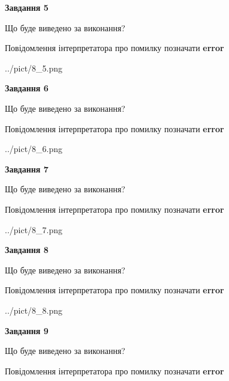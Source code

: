 \documentclass[11pt, ukrainian]{article}
\begin{document}
{\begin {large}
{\begin {center}\textbf{Завдання 5}\end {center}}\par
Що буде виведено за виконання? \par
Повідомлення інтерпретатора про помилку позначати \textbf{error}

\begin{center}
	{../pict/8_5.png}
\end{center}
\newpage

{\begin {center}\textbf{Завдання 6}\end {center}}\par
Що буде виведено за виконання? \par
Повідомлення інтерпретатора про помилку позначати \textbf{error}

\begin{center}
	{../pict/8_6.png}
\end{center}
\newpage

{\begin {center}\textbf{Завдання 7}\end {center}}\par
Що буде виведено за виконання? \par
Повідомлення інтерпретатора про помилку позначати \textbf{error}

\begin{center}
	{../pict/8_7.png}
\end{center}
\newpage

{\begin {center}\textbf{Завдання 8}\end {center}}\par
Що буде виведено за виконання? \par
Повідомлення інтерпретатора про помилку позначати \textbf{error}

\begin{center}
	{../pict/8_8.png}
\end{center}
\newpage

{\begin {center}\textbf{Завдання 9}\end {center}}\par
Що буде виведено за виконання? \par
Повідомлення інтерпретатора про помилку позначати \textbf{error}


\end{large}}
\end{document}
